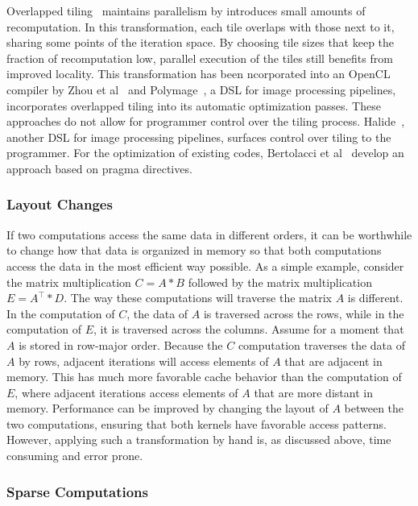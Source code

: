 Overlapped tiling~\cite{holewinski2012high,krishnamoorthy2007effective} maintains parallelism by introduces small amounts of recomputation.
In this transformation, each tile overlaps with those next to it, sharing some points of the iteration space.
By choosing tile sizes that keep the fraction of recomputation low, parallel execution of the tiles still benefits from improved locality.
This transformation has been ncorporated into an OpenCL compiler by Zhou et al~\cite{zhou2012hierarchical} and Polymage~\cite{mullapudi2015polymage}, a DSL for image processing pipelines, incorporates overlapped tiling into its automatic optimization passes.
These approaches do not allow for programmer control over the tiling process.
Halide~\cite{ragan-kelley2013halide}, another DSL for image processing pipelines, surfaces control over tiling to the programmer.
For the optimization of existing codes, Bertolacci et al~\cite{bertolacci2019using} develop an approach based on pragma directives.

\subsubsection{Layout Changes}

If two computations access the same data in different orders, it can be worthwhile to change how that data is organized in memory so that both computations access the data in the most efficient way possible.
As a simple example, consider the matrix multiplication $C = A * B$ followed by the matrix multiplication $E = A^{\top} * D$. 
The way these computations will traverse the matrix $A$ is different. 
In the computation of $C$, the data of $A$ is traversed across the rows, while in the computation of $E$, it is traversed across the columns.
Assume for a moment that $A$ is stored in row-major order.
Because the $C$ computation traverses the data of $A$ by rows, adjacent iterations will access elements of $A$ that are adjacent in memory.
This has much more favorable cache behavior than the computation of $E$, where adjacent iterations access elements of $A$ that are more distant in memory.
Performance can be improved by changing the layout of $A$ between the two computations, ensuring that both kernels have favorable access patterns.
However, applying such a transformation by hand is, as discussed above, time consuming and error prone. 


\subsubsection{Sparse Computations}

